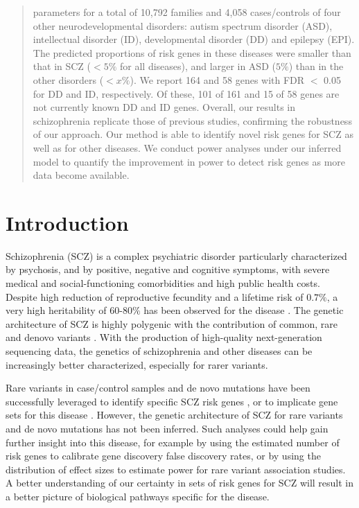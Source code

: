 \documentclass[]{article}
\begin{document}
\begin{abstract}
parameters for a total of 10,792 families and 4,058 cases/controls of four other
neurodevelopmental disorders: autism spectrum disorder (ASD),
intellectual disorder (ID), developmental disorder (DD) and epilepsy
(EPI). The predicted proportions of risk genes in these diseases were smaller
than that in SCZ ($< 5\%$ for all diseases), and larger in ASD ($5\%$) than in the other disorders ($< x\%$).
We report 164 and 58 genes with FDR $<$ 0.05 for DD
and ID, respectively. Of these, 101 of 161 and 15 of 58 genes are not currently
known DD and ID genes.
Overall, our results in schizophrenia
replicate those of previous studies, confirming the robustness of our approach. Our method is able
to identify novel risk genes for SCZ as well as for other diseases.
We conduct power analyses under our inferred model to quantify the improvement in power to detect risk
genes as more data become available.

\end{abstract}

\tableofcontents

\section{Introduction}

Schizophrenia (SCZ) is a complex psychiatric disorder particularly characterized by psychosis, and by positive, negative and cognitive symptoms, with severe medical and social-functioning comorbidities and high public health costs. Despite high
reduction of reproductive fecundity and a lifetime risk of $0.7\%$,
a very high heritability of 60-80$\%$ has been observed for the
disease \citep{lichtenstein2009common, sullivan2003schizophrenia}. The genetic architecture of SCZ is
highly polygenic with the contribution of common, rare and denovo
variants \citep{purcell2014polygenic, fromer2014novo, singh2016rare,  stefansson2009common,purcell2009common}. With the production of
high-quality next-generation sequencing data, the genetics of
schizophrenia and other diseases can be increasingly better characterized, especially for rarer variants.



Rare variants in case/control samples and de novo mutations have been successfully leveraged to
identify specific SCZ risk genes \citep{singh2016rare,takata2016novo}, or to implicate gene sets for this
disease \citep{purcell2014polygenic,fromer2014novo}.
However, the genetic architecture of SCZ for rare variants and de novo mutations has not been inferred. Such analyses could help gain further insight into this disease, for example by using the estimated number of risk genes to calibrate gene discovery false discovery rates, or by using the distribution of effect sizes to estimate power for rare variant association studies. A better understanding of our certainty in sets of risk genes for SCZ will result in a
better picture of biological pathways specific for the disease.
\end{document}
